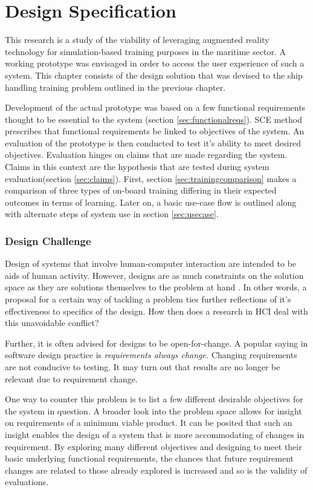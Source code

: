 \chapter{Design Specification}
This research is a study of the viability of leveraging augmented reality technology for simulation-based training purposes in the maritime sector. A working prototype was envisaged in order to access the user experience of such a system. This chapter consists of the design solution that was devised to the ship handling training problem outlined in the previous chapter. 

Development of the actual prototype was based on a few functional requirements thought to be essential to the system (section \ref{sec:functionalreqs}). SCE method prescribes that functional requirements be linked to objectives of the system. An evaluation of the prototype is then conducted to test it's ability to meet desired objectives. Evaluation hinges on claims that are made regarding the system. Claims in this context are the hypothesis that are tested during system evaluation(section \ref{sec:claims}). First, section \ref{sec:trainingcomparison} makes a comparison of three types of on-board training differing in their expected outcomes in terms of learning. Later on, a basic use-case flow is outlined along with alternate steps of system use in section \ref{sec:usecase}.


\subsection{Design Challenge}
Design of systems that involve human-computer interaction are intended to be aids of human activity. However, designs are as much constraints on the solution space as they are solutions themselves to the problem at hand \parencite{carroll2000five}. In other words, a proposal for a certain way of tackling a problem ties further reflections of it's effectiveness to specifics of the design. How then does a research in HCI deal with this unavoidable conflict?

Further, it is often advised for designs to be open-for-change. A popular saying in software design practice is \textit{requirements always change.} Changing requirements are not conducive to testing. It may turn out that results are no longer be relevant due to requirement change.
 
One way to counter this problem is to list a few different desirable objectives for the system in question. A broader look into the problem space allows for insight on requirements of a minimum viable product. It can be posited that such an insight enables the design of a system that is more accommodating of changes in requirement. By exploring many different objectives and designing to meet their basic underlying functional requirements, the chances that future requirement changes are related to those already explored is increased and so is the validity of evaluations. 

